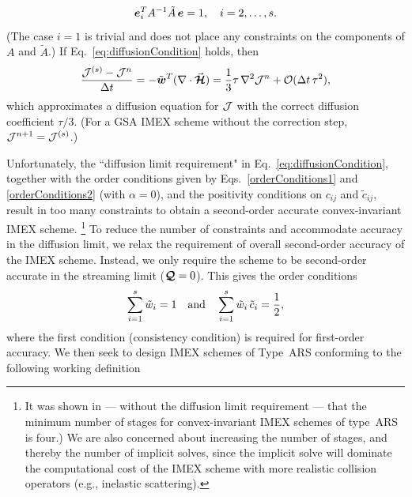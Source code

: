 \begin{equation}
  \boldsymbol{e}_{i}^{T}A^{-1}\tilde{A}\,\boldsymbol{e} = 1, \quad i=2,\ldots,s.
  \label{eq:diffusionCondition}
\end{equation}
(The case $i=1$ is trivial and does not place any constraints on the components of $A$ and $\tilde{A}$.)  
If Eq.~\eqref{eq:diffusionCondition} holds, then
\begin{equation}
  \frac{\mathcal{J}^{(s)}-\mathcal{J}^{n}}{\Delta t}
  =-\tilde{\boldsymbol{w}}^{T}(\nabla\cdot\vec{\boldsymbol{\mathcal{H}}})
  =\frac{1}{3}\tau\,\nabla^{2}\mathcal{J}^{n}+\mathcal{O}(\Delta t\,\tau^{2}), 
\end{equation}
which approximates a diffusion equation for $\mathcal{J}$ with the correct diffusion coefficient $\tau/3$.  
(For a GSA IMEX scheme without the correction step, $\mathcal{J}^{n+1}=\mathcal{J}^{(s)}$.)  

Unfortunately, the ``diffusion limit requirement" in Eq.~\eqref{eq:diffusionCondition}, together with the order conditions given by Eqs.~\eqref{orderConditions1} and \eqref{orderConditions2} (with $\alpha=0$), and the positivity conditions on $c_{ij}$ and $\tilde{c}_{ij}$, result in too many constraints to obtain a second-order accurate convex-invariant IMEX scheme.%
\footnote{It was shown in \cite{hu_etal_2018} --- without the diffusion limit requirement --- that the minimum number of stages for convex-invariant IMEX schemes of type~ARS is four.)  
We are also concerned about increasing the number of stages, and thereby the number of implicit solves, since the implicit solve will dominate the computational cost of the IMEX scheme with more realistic collision operators (e.g., inelastic scattering).}  
To reduce the number of constraints and accommodate accuracy in the diffusion limit, we relax the requirement of overall second-order accuracy of the IMEX scheme.  
Instead, we only require the scheme to be second-order accurate in the streaming limit ($\boldsymbol{\mathcal{Q}}=0$).  
This gives the order conditions
\begin{equation}
  \sum_{i=1}^{s}\tilde{w}_{i}=1
  \quad\text{and}\quad
  \sum_{i=1}^{s}\tilde{w}_{i}\,\tilde{c}_{i}=\frac{1}{2},
  \label{eq:orderConditionsEx}
\end{equation}
where the first condition (consistency condition) is required for first-order accuracy.  
We then seek to design IMEX schemes of Type~ARS conforming to the following working definition
